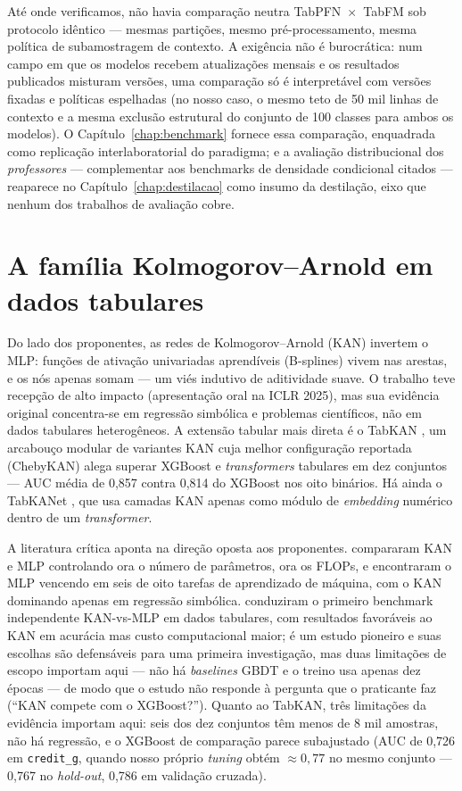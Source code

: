 Até onde verificamos, não havia comparação neutra
TabPFN~$\times$~TabFM sob
protocolo idêntico --- mesmas partições, mesmo pré-processamento, mesma
política de subamostragem de contexto. A exigência não é burocrática: num
campo em que os modelos recebem atualizações mensais e os resultados
publicados misturam versões, uma comparação só é interpretável com
versões fixadas e políticas espelhadas (no nosso caso, o mesmo teto de 50
mil linhas de contexto e a mesma exclusão estrutural do conjunto de 100
classes para ambos os modelos). O Capítulo~\ref{chap:benchmark}
fornece essa comparação, enquadrada como replicação interlaboratorial do
paradigma; e a avaliação distribucional dos \emph{professores} ---
complementar aos benchmarks de densidade condicional citados --- reaparece
no Capítulo~\ref{chap:destilacao} como insumo da destilação, eixo que
nenhum dos trabalhos de avaliação cobre.

\section{A família Kolmogorov--Arnold em dados tabulares}
\label{sec:rel-kan}

Do lado dos proponentes, as redes de Kolmogorov--Arnold (KAN)
\citep{kan2024} invertem o MLP: funções de ativação univariadas aprendíveis
(B-splines) vivem nas arestas, e os nós apenas somam --- um viés indutivo
de aditividade suave. O trabalho teve recepção de alto impacto (apresentação
oral na ICLR 2025), mas sua evidência original concentra-se em regressão
simbólica e problemas científicos, não em dados tabulares heterogêneos. A
extensão tabular mais direta é o TabKAN \citep{tabkan2025}, um arcabouço
modular de variantes KAN cuja melhor configuração reportada (ChebyKAN)
alega superar XGBoost e \emph{transformers} tabulares em dez conjuntos ---
AUC média de 0,857 contra 0,814 do XGBoost nos oito binários. Há ainda o
TabKANet \citep{tabkanet2024}, que usa camadas KAN apenas como módulo de
\emph{embedding} numérico dentro de um \emph{transformer}.

A literatura crítica aponta na
direção oposta aos proponentes. \citet{kancritical2024} compararam KAN e
MLP controlando ora o número de parâmetros, ora os FLOPs, e encontraram o
MLP vencendo em seis de oito tarefas de aprendizado de máquina, com o KAN
dominando apenas em regressão simbólica. \citet{poeta2024} conduziram o
primeiro benchmark independente KAN-vs-MLP em dados tabulares, com
resultados favoráveis ao KAN em acurácia mas custo computacional maior; é
um estudo pioneiro e suas escolhas são defensáveis para uma primeira
investigação, mas duas limitações de escopo importam aqui --- não há
\emph{baselines} GBDT e o treino usa apenas dez épocas --- de modo que o
estudo não responde à pergunta que o praticante faz (``KAN compete com o
XGBoost?''). Quanto ao TabKAN, três limitações da evidência importam aqui: seis dos dez
conjuntos têm menos de 8 mil amostras, não há regressão, e o XGBoost de
comparação parece subajustado (AUC de 0,726 em \texttt{credit\_g}, quando
nosso próprio \emph{tuning} obtém ${\approx}0{,}77$ no mesmo conjunto ---
0,767 no \emph{hold-out}, 0,786 em validação cruzada).

